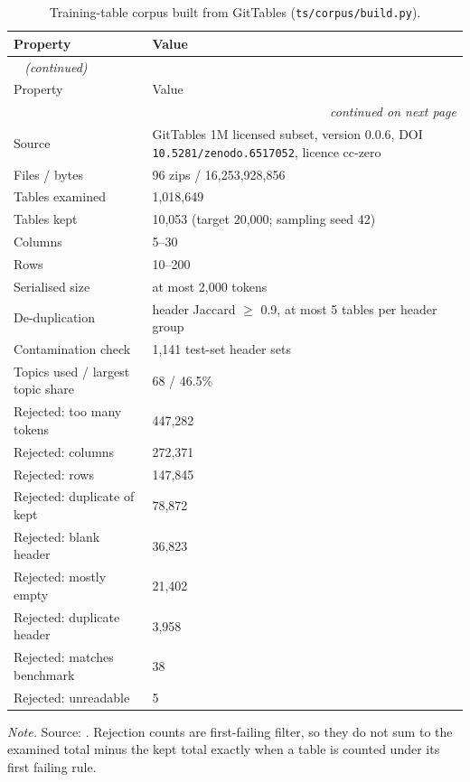 {\small
{}
\setlength{\tabcolsep}{4.2pt}
\begin{longtable}{@{}lp{9.5cm}@{}}
\caption{Training-table corpus built from GitTables (\texttt{ts/corpus/build.py}).}\label{tab:gen-corpus}\\
\toprule
\rowcolor{headshade}Property & Value\\
\midrule
\endfirsthead
\multicolumn{2}{l}{\textit{\tablename~\thetable{} (continued)}}\\
\toprule
\rowcolor{headshade}Property & Value\\
\midrule
\endhead
\midrule
\multicolumn{2}{r}{\textit{continued on next page}}\\
\endfoot
\bottomrule
\endlastfoot
Source & GitTables 1M licensed subset, version 0.0.6, DOI \texttt{10.5281/zenodo.6517052}, licence cc-zero\\
Files / bytes & 96 zips / 16,253,928,856\\
Tables examined & 1,018,649\\
Tables kept & 10,053 (target 20,000; sampling seed 42)\\
Columns & 5--30\\
Rows & 10--200\\
Serialised size & at most 2,000 tokens\\
De-duplication & header Jaccard $\geq$ 0.9, at most 5 tables per header group\\
Contamination check & 1,141 test-set header sets\\
Topics used / largest topic share & 68 / 46.5\%\\
Rejected: too many tokens & 447,282\\
Rejected: columns & 272,371\\
Rejected: rows & 147,845\\
Rejected: duplicate of kept & 78,872\\
Rejected: blank header & 36,823\\
Rejected: mostly empty & 21,402\\
Rejected: duplicate header & 3,958\\
Rejected: matches benchmark & 38\\
Rejected: unreadable & 5\\
\end{longtable}
}
\vspace{-0.6\baselineskip}
{\footnotesize\color{slate}\textit{Note.} Source: . Rejection counts are first-failing filter, so they do not sum to the examined total minus the kept total exactly when a table is counted under its first failing rule.\par}
\medskip
